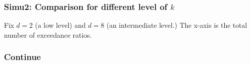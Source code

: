 \documentclass{beamer}
\begin{document}
\begin{frame}
    \frametitle{Simu2: Comparison for different level of $k$}
    Fix $d=2$ (a low level) and $d=8$ (an intermediate level.) The x-axis is the total number of exceedance ratios.
    \begin{figure}[htbp]
        \centering

        \end{figure}
\end{frame}

\begin{frame}
    \frametitle{Continue}
    \begin{figure}[htbp]
        \centering
        \end{figure}
\end{frame}
\end{document}
